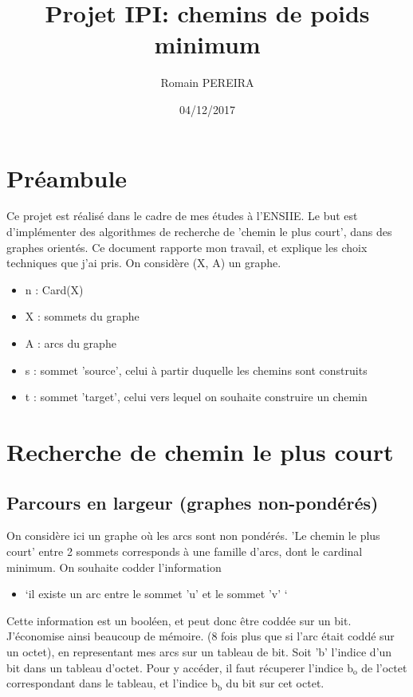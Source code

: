 \documentclass[a4paper,10pt]{article}
\title{Projet IPI: chemins de poids minimum}
\author{Romain PEREIRA}
\date{04/12/2017}
\begin{document}
  \maketitle
  \tableofcontents

  \section*{Préambule}
    Ce projet est réalisé dans le cadre de mes études à l'ENSIIE.\newline
    Le but est d'implémenter des algorithmes de recherche de 'chemin le plus court', dans des graphes orientés.\newline
    Ce document rapporte mon travail, et explique les choix techniques que j'ai pris.\newline\newline
    On considère (X, A) un graphe.
    \begin{itemize}[label=-]
      \item n : Card(X)
      \item X : sommets du graphe
      \item A : arcs du graphe
      \item s : sommet 'source', celui à partir duquelle les chemins sont construits
      \item t : sommet 'target', celui vers lequel on souhaite construire un chemin
    \end{itemize}
    
  \newpage
  \section{Recherche de chemin le plus court}
  \subsection{Parcours en largeur (graphes non-pondérés)}
    On considère ici un graphe où les arcs sont non pondérés.\newline
    'Le chemin le plus court' entre 2 sommets corresponds à une famille d'arcs, dont le cardinal minimum.\newline
    On souhaite codder l'information
    \begin{itemize}[label=-]
      \item `il existe un arc entre le sommet 'u' et le sommet 'v' `
    \end{itemize}
    Cette information est un booléen, et peut donc être coddée sur un bit.
    J'économise ainsi beaucoup de mémoire. (8 fois plus que si l'arc était coddé sur un octet),
    en representant mes arcs sur un tableau de bit.\newline\newline
    Soit 'b' l'indice d'un bit dans un tableau d'octet.
    Pour y accéder, il faut récuperer l'indice $\textrm{b}_\textrm{o}$ de l'octet correspondant dans le tableau,
    et l'indice $\textrm{b}_\textrm{b}$ du bit sur cet octet.\newline
    
\end{document}
